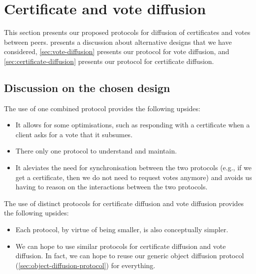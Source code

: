 \section{Certificate and vote diffusion}


This section presents our proposed protocols for diffusion of certificates and votes between peers.
 presents a discussion about alternative designs that we have considered, \cref{sec:vote-diffusion} presents our protocol for vote diffusion, and \cref{sec:certificate-diffusion} presents our protocol for certificate diffusion.

\subsection{Discussion on the chosen design}%
\label{sec:cert-vote-diff-discussion}


The use of one combined protocol provides the following upsides:
%
\begin{itemize}
\item
  It allows for some optimisations, such as responding with a certificate when a client asks for a vote that it subsumes.

\item
  There only one protocol to understand and maintain.

\item
  It aleviates the need for synchronisation between the two protocols (e.g., if we get a certificate, then we do not need to request votes anymore) and avoids us having to reason on the interactions between the two protocols.
\end{itemize}

The use of distinct protocols for certificate diffusion and vote diffusion provides the following upsides:

\begin{itemize}
\item
  Each protocol, by virtue of being smaller, is also conceptually simpler.

\item
  We can hope to use similar protocols for certificate diffusion and vote diffusion.
  In fact, we can hope to reuse our generic object diffusion protocol (\cref{sec:object-diffusion-protocol}) for everything.
\end{itemize}

